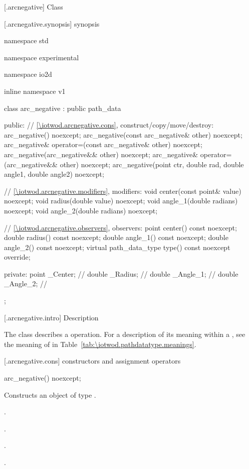  [\iotwod.arcnegative] {Class }

 [\iotwod.arcnegative.synopsis] { synopsis}

\begin{codeblock}
namespace std { namespace experimental { namespace io2d { inline namespace v1 {
  class arc_negative : public path_data {
  public:
    // \ref{\iotwod.arcnegative.cons}, construct/copy/move/destroy:
    arc_negative() noexcept;
    arc_negative(const arc_negative& other) noexcept;
    arc_negative& operator=(const arc_negative& other) noexcept;
    arc_negative(arc_negative&& other) noexcept;
    arc_negative& operator=(arc_negative&& other) noexcept;
    arc_negative(point ctr, double rad, double angle1, double angle2) noexcept;

    // \ref{\iotwod.arcnegative.modifiers}, modifiers:
    void center(const point& value) noexcept;
    void radius(double value) noexcept;
    void angle_1(double radians) noexcept;
    void angle_2(double radians) noexcept;

    // \ref{\iotwod.arcnegative.observers}, observers:
    point center() const noexcept;
    double radius() const noexcept;
    double angle_1() const noexcept;
    double angle_2() const noexcept;
    virtual path_data_type type() const noexcept override;

  private:
    point _Center;   // \expos
    double _Radius;  // \expos
    double _Angle_1; // \expos
    double _Angle_2; // \expos
  };
} } } }
\end{codeblock}

 [\iotwod.arcnegative.intro] { Description}

\pnum
{}
The class  describes a  operation. For a description of its meaning within a , see the meaning of  in Table~\ref{tab:\iotwod.pathdatatype.meanings}.

 [\iotwod.arcnegative.cons] { constructors and assignment operators}

\begin{itemdecl}
    arc_negative() noexcept;
\end{itemdecl}
\begin{itemdescr}
	\pnum
	\effects
	Constructs an object of type .
	
	\pnum
	\postconditions
	.

	.

	.

	.

\end{itemdescr}

